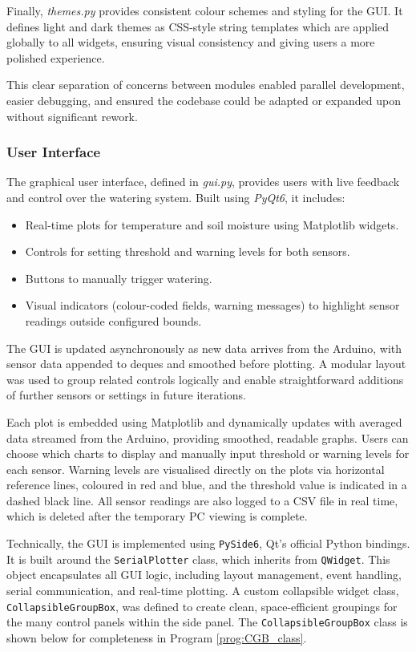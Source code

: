 \documentclass[a4paper,11pt]{article}
\begin{document}
Finally, \textit{themes.py} provides consistent colour schemes and styling for the GUI. 
It defines light and dark themes as CSS-style string templates 
which are applied globally to all widgets, 
ensuring visual consistency and giving users a more polished experience.

This clear separation of concerns between modules enabled parallel development, 
easier debugging, and ensured the codebase could be adapted 
or expanded upon without significant rework.

\subsubsection{User Interface}
\label{subsec:software_ui}

The graphical user interface, defined in \textit{gui.py}, 
provides users with live feedback and control over the watering system. 
Built using \textit{PyQt6}, it includes:

\begin{itemize}[nosep]
    \item Real-time plots for temperature and soil moisture using Matplotlib widgets.
    \item Controls for setting threshold and warning levels for both sensors.
    \item Buttons to manually trigger watering.
    \item Visual indicators (colour-coded fields, warning messages) 
    to highlight sensor readings outside configured bounds.
\end{itemize}

The GUI is updated asynchronously as new data arrives from the Arduino, 
with sensor data appended to deques and smoothed before plotting. 
A modular layout was used to group related controls logically and 
enable straightforward additions of further sensors or settings in future iterations.

Each plot is embedded using Matplotlib 
and dynamically updates with averaged data streamed from the Arduino, 
providing smoothed, readable graphs. 
Users can choose which charts to display
and manually input threshold or warning levels for each sensor.
Warning levels are visualised directly on the plots via horizontal reference lines,
coloured in red and blue, and the threshold value is indicated in a dashed black line. 
All sensor readings are also logged to a CSV file in real time,
which is deleted after the temporary PC viewing is complete.

Technically, the GUI is implemented using \texttt{PySide6}, 
Qt's official Python bindings. 
It is built around the \texttt{SerialPlotter} class, 
which inherits from \texttt{QWidget}. 
This object encapsulates all GUI logic, including layout management, 
event handling, serial communication, and real-time plotting. 
A custom collapsible widget class, \texttt{CollapsibleGroupBox}, 
was defined to create clean, space-efficient groupings for the many control panels 
within the side panel.
The \texttt{CollapsibleGroupBox} class is shown below for completeness 
in Program \ref{prog:CGB_class}.
\end{document}

